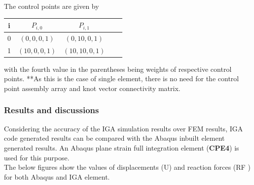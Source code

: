 \documentclass[11pt]{article}
\begin{document}
\begin{enumerate}

	The control points are given by
	\begin{center}
		\begin{tabular}{ |c|c|c|c|c| } 
			\hline
			i & $ P_{i,0} $ & $ P_{i,1} $  \\ \hline
			0 & $ (0,0,0,1) $ & $ (0,10,0,1) $  \\ \hline
			1 & $ (10,0,0,1) $ & $ (10,10,0,1) $  \\ \hline
			
		\end{tabular}
	\end{center}
	with the fourth value in the parentheses being weights of respective control points.
	**As this is the case of single element, there is no need for the control point
	assembly array and knot vector connectivity matrix.
\end{enumerate}
\subsubsection{Results and discussions} \label{ResultsMech}
Considering the accuracy of the IGA simulation results over FEM results, IGA code generated results can be compared with the Abaqus inbuilt element generated results. An Abaqus plane strain full integration element (\textbf{CPE4}) \cite{abaqus10version} is used for this purpose.
\\The below figures show the values of displacements (U) and reaction forces (RF ) for both Abaqus and IGA element.\\
\end{document}
